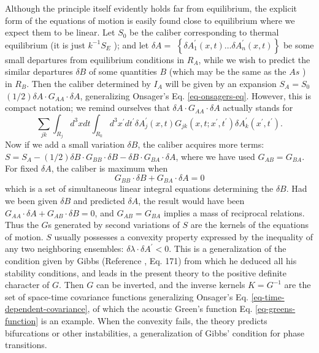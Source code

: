 \documentclass{article}
\begin{document}
Although the principle itself evidently holds far from equilibrium, the explicit form of the equations of motion is easily found close to equilibrium where we expect them to be linear. Let $S_0$ be the caliber corresponding to thermal equilibrium (it is just $k^{-1} S_E$ ); and let $\delta A=$ $\left\{\delta A_1^{\prime}(x, t) \ldots \delta A_n^{\prime}(x, t)\right\}$ be some small departures from equilibrium conditions in $R_A$, while we wish to predict the similar departures $\delta B$ of some quantities $B$ (which may be the same as the $A s$ ) in $R_B$. Then the caliber determined by $I_A$ will be given by an expansion $S_A=S_0$ $(1 / 2) \delta A \cdot G_{A A} \cdot \delta A$, generalizing Onsager's Eq. \ref{eq-onsagers-eq}. However, this is compact notation; we remind ourselves that $\delta A \cdot G_{A A} \cdot \delta A$ actually stands for
\begin{equation}
\sum_{j k} \int_{R_j} d^3 x d t \int_{R_k} d^3 x^{\prime} d t^{\prime} \delta A_j^{\prime}(x, t) G_{j k}\left(x, t ; x^{\prime}, t^{\prime}\right) \delta A_k^{\prime}\left(x^{\prime}, t^{\prime}\right).
\end{equation}
Now if we add a small variation $\delta B$, the caliber acquires more terms: $S=S_A-(1 / 2) \delta B \cdot G_{B B} \cdot \delta B-\delta B \cdot G_{B A} \cdot \delta A$, where we have used $G_{A B}=G_{B A}$. For fixed $\delta A$, the caliber is maximum when
\begin{equation}
G_{B B} \cdot \delta B+G_{B A} \cdot \delta A=0
\end{equation}
which is a set of simultaneous linear integral equations determining the $\delta B$. Had we been given $\delta B$ and predicted $\delta A$, the result would have been $G_{A A} \cdot \delta A+G_{A B} \cdot \delta B=0$, and $G_{A B}=G_{B A}$ implies a mass of reciprocal relations. Thus the $G$s generated by second variations of $S$ are the kernels of the equations of motion. $S$ usually possesses a convexity property expressed by the inequality of any two neighboring ensembles: $\delta \lambda \cdot \delta A^{\prime}<0$. This is a generalization of the condition given by Gibbs (Reference \cite{gibbs1876}, Eq. 171) from which he deduced all his stability conditions, and leads in the present theory to the positive definite character of $G$. Then $G$ can be inverted, and the inverse kernels $K=G^{-1}$ are the set of space-time covariance functions generalizing Onsager's Eq. \ref{eq-time-dependent-covariance}, of which the acoustic Green's function Eq. \ref{eq-greens-function} is an example. When the convexity fails, the theory predicts bifurcations or other instabilities, a generalization of Gibbs' condition for phase transitions.
\end{document}
